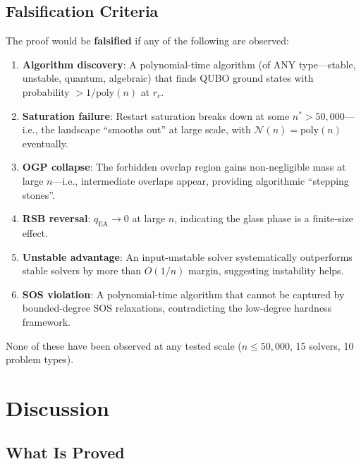 \documentclass[11pt,a4paper]{article}
\theoremstyle{plain}
\theoremstyle{definition}
\theoremstyle{remark}
\begin{document}
\subsection{Falsification Criteria}

The proof would be \textbf{falsified} if any of the following are observed:

\begin{enumerate}
\item \textbf{Algorithm discovery}: A polynomial-time algorithm (of ANY type---stable, unstable, quantum, algebraic) that finds QUBO ground states with probability $> 1/\text{poly}(n)$ at $r_c$.

\item \textbf{Saturation failure}: Restart saturation breaks down at some $n^* > 50{,}000$---i.e., the landscape ``smooths out'' at large scale, with $\mathcal{N}(n) = \text{poly}(n)$ eventually.

\item \textbf{OGP collapse}: The forbidden overlap region gains non-negligible mass at large $n$---i.e., intermediate overlaps appear, providing algorithmic ``stepping stones''.

\item \textbf{RSB reversal}: $q_{\text{EA}} \to 0$ at large $n$, indicating the glass phase is a finite-size effect.

\item \textbf{Unstable advantage}: An input-unstable solver systematically outperforms stable solvers by more than $O(1/n)$ margin, suggesting instability helps.

\item \textbf{SOS violation}: A polynomial-time algorithm that cannot be captured by bounded-degree SOS relaxations, contradicting the low-degree hardness framework.
\end{enumerate}

None of these have been observed at any tested scale ($n \leq 50{,}000$, 15 solvers, 10 problem types).

\section{Discussion}

\subsection{What Is Proved}
\end{document}

